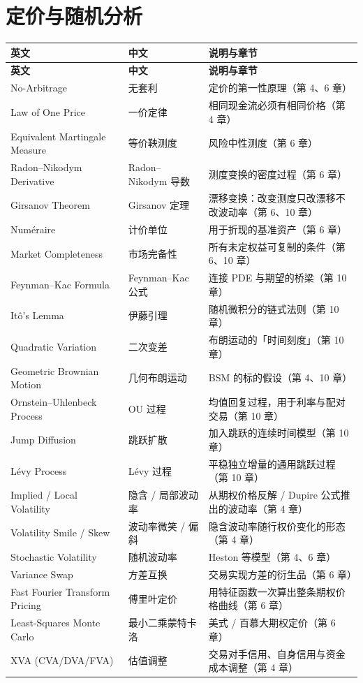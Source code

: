 \section{定价与随机分析}

{\tablefont
\begin{longtable}{@{}L{4.6cm}L{3.6cm}L{6.6cm}@{}}
\toprule
\textbf{英文} & \textbf{中文} & \textbf{说明与章节} \\
\midrule
\endfirsthead
\toprule
\textbf{英文} & \textbf{中文} & \textbf{说明与章节} \\
\midrule
\endhead
\bottomrule
\endlastfoot
No-Arbitrage & 无套利 & 定价的第一性原理（第 4、6 章） \\
Law of One Price & 一价定律 & 相同现金流必须有相同价格（第 4 章） \\
Equivalent Martingale Measure & 等价鞅测度 & 风险中性测度（第 6 章） \\
Radon--Nikodym Derivative & Radon--Nikodym 导数 & 测度变换的密度过程（第 6 章） \\
Girsanov Theorem & Girsanov 定理 & 漂移变换：改变测度只改漂移不改波动率（第 6、10 章） \\
Num\'eraire & 计价单位 & 用于折现的基准资产（第 6 章） \\
Market Completeness & 市场完备性 & 所有未定权益可复制的条件（第 6、10 章） \\
Feynman--Kac Formula & Feynman--Kac 公式 & 连接 PDE 与期望的桥梁（第 10 章） \\
It\^o's Lemma & 伊藤引理 & 随机微积分的链式法则（第 10 章） \\
Quadratic Variation & 二次变差 & 布朗运动的「时间刻度」（第 10 章） \\
Geometric Brownian Motion & 几何布朗运动 & BSM 的标的假设（第 4、10 章） \\
Ornstein--Uhlenbeck Process & OU 过程 & 均值回复过程，用于利率与配对交易（第 10 章） \\
Jump Diffusion & 跳跃扩散 & 加入跳跃的连续时间模型（第 10 章） \\
L\'evy Process & L\'evy 过程 & 平稳独立增量的通用跳跃过程（第 10 章） \\
Implied / Local Volatility & 隐含 / 局部波动率 & 从期权价格反解 / Dupire 公式推出的波动率（第 4 章） \\
Volatility Smile / Skew & 波动率微笑 / 偏斜 & 隐含波动率随行权价变化的形态（第 4 章） \\
Stochastic Volatility & 随机波动率 & Heston 等模型（第 4、6 章） \\
Variance Swap & 方差互换 & 交易实现方差的衍生品（第 6 章） \\
Fast Fourier Transform Pricing & 傅里叶定价 & 用特征函数一次算出整条期权价格曲线（第 6 章） \\
Least-Squares Monte Carlo & 最小二乘蒙特卡洛 & 美式 / 百慕大期权定价（第 6 章） \\
XVA (CVA/DVA/FVA) & 估值调整 & 交易对手信用、自身信用与资金成本调整（第 4 章） \\
\end{longtable}
}


